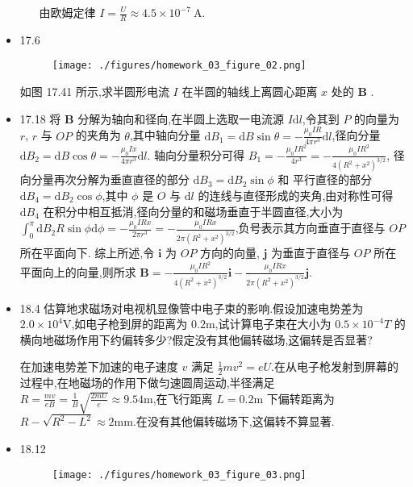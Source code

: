 \begin{itemize}
\begin{enumerate}
                    由欧姆定律 $I=\frac{U}{R}\approx 4.5\times 10^{-7}\ \mathrm{A}$.
            \end{enumerate}
        \item 17.6
            \begin{figure}[htbp]
                \texttt{[image: ./figures/homework\_03\_figure\_02.png]}
            \end{figure}

            如图 17.41 所示,求半圆形电流 $I$ 在半圆的轴线上离圆心距离 $x$ 处的 $\bm{B}$ .

        \item 17.18 将 $\bm{B}$ 分解为轴向和径向,在半圆上选取一电流源 $I\mathrm{d}l$,令其到 $P$ 的向量为 $r$, $r$ 与 $OP$ 的夹角为 $\theta$,其中轴向分量 $\mathrm{d}B_1=\mathrm{d}B\sin \theta=-\frac{\mu_0IR}{4\pi r^3}\mathrm{d}l$,径向分量 $\mathrm{d}B_2=\mathrm{d}B\cos \theta=-\frac{\mu_0Ix}{4\pi r^3}\mathrm{d}l$. 轴向分量积分可得 $B_1=-\frac{\mu_0IR^2}{4r^3}=-\frac{\mu_0IR^2}{4(R^2+x^2)^{3 / 2}}$, 径向分量再次分解为垂直直径的部分 $\mathrm{d}B_3=\mathrm{d}B_2\sin \phi$ 和 平行直径的部分 $\mathrm{d}B_4=\mathrm{d}B_2\cos \phi$,其中 $\phi$ 是 $O$ 与 $\mathrm{d}l$ 的连线与直径形成的夹角,由对称性可得 $\mathrm{d}B_4$ 在积分中相互抵消,径向分量的和磁场垂直于半圆直径,大小为 $\int_{0}^{\pi}\mathrm{d}B_2 R\sin \phi \mathrm{d}\phi=-\frac{\mu_0IRx}{2\pi r^3}=-\frac{\mu_0IRx}{2\pi(R^2+x^2)^{3 / 2}}$,负号表示其方向垂直于直径与 $OP$ 所在平面向下. 综上所述,令 $\bm{i}$ 为 $OP$ 方向的向量,  $\bm{j}$ 为垂直于直径与 $OP$ 所在平面向上的向量,则所求 $\bm{B}=-\frac{\mu_0IR^2}{4(R^2+x^2)^{3 / 2}}\bm{i}-\frac{\mu_0IRx}{2\pi(R^2+x^2)^{3 / 2}}\bm{j}$.
        \item 18.4 估算地求磁场对电视机显像管中电子束的影响.假设加速电势差为 $2.0\times 10^{4}\mathrm{V}$,如电子枪到屏的距离为 $0.2\mathrm{m}$,试计算电子束在大小为 $0.5\times 10^{-4}T$ 的横向地磁场作用下约偏转多少?假定没有其他偏转磁场,这偏转是否显著?

            在加速电势差下加速的电子速度 $v$ 满足 $\frac{1}{2}mv^2=eU$.在从电子枪发射到屏幕的过程中,在地磁场的作用下做匀速圆周运动,半径满足 $R=\frac{mv}{eB}=\frac{1}{B}\sqrt{\frac{2mU}{e}}\approx 9.54\mathrm{m}$,在飞行距离 $L=0.2\mathrm{m}$ 下偏转距离为 $R-\sqrt{R^2-L^2}\approx 2\mathrm{mm}$.在没有其他偏转磁场下,这偏转不算显著.
        \item 18.12 
            \begin{figure}[htbp]
                \texttt{[image: ./figures/homework\_03\_figure\_03.png]}
            \end{figure}
            

\end{itemize}
